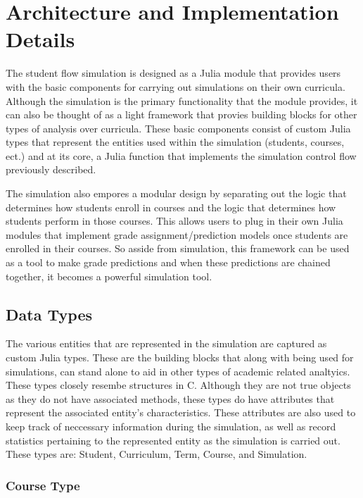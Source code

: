\documentclass[botnum, fleqn]{unmeethesis}
\begin{document}
\section{Architecture and Implementation Details}

The student flow simulation is designed as a Julia module that provides users with the basic components for carrying out simulations on their own curricula. Although the simulation is the primary functionality that the module provides, it can also be thought of as a light framework that provies building blocks for other types of analysis over curricula. These basic components consist of custom Julia types that represent the entities used within the simulation (students, courses, ect.) and at its core, a Julia function that implements the simulation control flow previously described.

The simulation also empores a modular design by separating out the logic that determines how students enroll in courses and the logic that determines how students perform in those courses. This allows users to plug in their own Julia modules that implement grade assignment/prediction models once students are enrolled in their courses. So asside from simulation, this framework can be used as a tool to make grade predictions and when these predictions are chained together, it becomes a powerful simulation tool.

\subsection{Data Types}

The various entities that are represented in the simulation are captured as custom Julia types. These are the building blocks that along with being used for simulations, can stand alone to aid in other types of academic related analtyics. These types closely resembe structures in C. Although they are not true objects as they do not have associated methods, these types do have attributes that represent the associated entity's characteristics. These attributes are also used to keep track of neccessary information during the simulation, as well as record statistics pertaining to the represented entity as the simulation is carried out. These types are: Student, Curriculum, Term, Course, and Simulation.

\subsubsection{Course Type}
\end{document}
